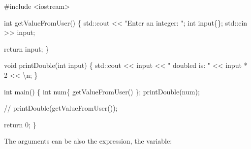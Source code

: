 \documentclass[
  letterpaper,
  DIV=11,
  numbers=noendperiod]{scrreprt}
\newenvironment{Shaded}{\begin{snugshade}}{\end{snugshade}}
\newcommand{\CommentTok}[1]{\textcolor[rgb]{0.37,0.37,0.37}{#1}}
\newcommand{\DecValTok}[1]{\textcolor[rgb]{0.68,0.00,0.00}{#1}}
\newcommand{\ErrorTok}[1]{\textcolor[rgb]{0.68,0.00,0.00}{#1}}
\newcommand{\FunctionTok}[1]{\textcolor[rgb]{0.28,0.35,0.67}{#1}}
\newcommand{\NormalTok}[1]{\textcolor[rgb]{0.00,0.23,0.31}{#1}}
\newcommand{\SpecialCharTok}[1]{\textcolor[rgb]{0.37,0.37,0.37}{#1}}
\newcommand{\StringTok}[1]{\textcolor[rgb]{0.13,0.47,0.30}{#1}}
\begin{document}
\begin{Shaded}
\begin{Highlighting}[]
\CommentTok{\#include \textless{}iostream\textgreater{}}

\NormalTok{int }\FunctionTok{getValueFromUser}\NormalTok{()}
\NormalTok{\{}
\NormalTok{    std}\SpecialCharTok{::}\NormalTok{cout }\SpecialCharTok{\textless{}}\ErrorTok{\textless{}} \StringTok{"Enter an integer: "}\NormalTok{;}
\NormalTok{    int input\{\};}
\NormalTok{    std}\SpecialCharTok{::}\NormalTok{cin }\SpecialCharTok{\textgreater{}}\ErrorTok{\textgreater{}}\NormalTok{ input;}

\NormalTok{    return input;}
\NormalTok{\}}

\NormalTok{void }\FunctionTok{printDouble}\NormalTok{(int input)}
\NormalTok{\{}
\NormalTok{    std}\SpecialCharTok{::}\NormalTok{cout }\SpecialCharTok{\textless{}}\ErrorTok{\textless{}}\NormalTok{ input }\SpecialCharTok{\textless{}}\ErrorTok{\textless{}} \StringTok{" doubled is: "} \SpecialCharTok{\textless{}}\ErrorTok{\textless{}}\NormalTok{ input }\SpecialCharTok{*} \DecValTok{2} \SpecialCharTok{\textless{}}\ErrorTok{\textless{}} \StringTok{\textquotesingle{}}\SpecialCharTok{\textbackslash{}n}\StringTok{\textquotesingle{}}\NormalTok{;}
\NormalTok{\}}

\NormalTok{int }\FunctionTok{main}\NormalTok{()}
\NormalTok{\{}
\NormalTok{    int num\{ }\FunctionTok{getValueFromUser}\NormalTok{() \};}
    \FunctionTok{printDouble}\NormalTok{(num);}

    \SpecialCharTok{/}\ErrorTok{/} \FunctionTok{printDouble}\NormalTok{(}\FunctionTok{getValueFromUser}\NormalTok{());}

\NormalTok{    return }\DecValTok{0}\NormalTok{;}
\NormalTok{\}}
\end{Highlighting}
\end{Shaded}

The arguments can be also the expression, the variable:
\end{document}
